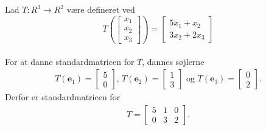 %
\begin{eks}\label{entydigeks}
%
Lad $T: R^3 \rightarrow R^2$ være defineret ved 
$$T\left(
\begin{bmatrix}
x_1\\
x_2\\
x_3
\end{bmatrix}
\right)
=
\begin{bmatrix}%
5x_1+x_2\\
3x_2+2x_3
\end{bmatrix}
$$ \\
For at danne standardmatricen for $T$, dannes søjlerne 
\begin{align*}
T(\mathbf{e}_1)=
\begin{bmatrix}
5\\
0
\end{bmatrix}\text{, }
T(\mathbf{e}_2)=
\begin{bmatrix}
1\\
3
\end{bmatrix}\text{ og }
T(\mathbf{e}_3)=
\begin{bmatrix}
0\\
2
\end{bmatrix}.
\end{align*}
Derfor er standardmatricen for
\begin{align*}
T=
\begin{bmatrix}
5 & 1 & 0\\
0 & 3 & 2
\end{bmatrix}.
\end{align*}
\end{eks}